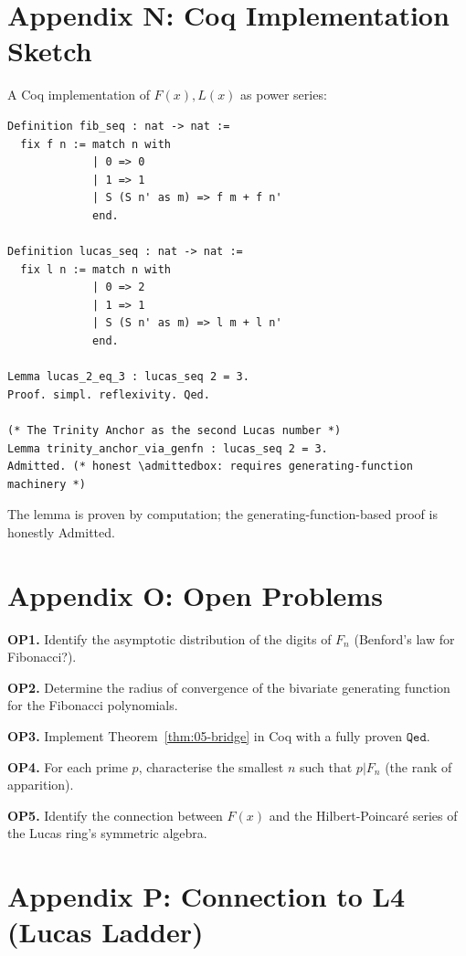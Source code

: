 \section*{Appendix N: Coq Implementation Sketch}
\label{sec:05-app-N}

A Coq implementation of $F(x), L(x)$ as power series:
\begin{verbatim}
Definition fib_seq : nat -> nat :=
  fix f n := match n with
             | 0 => 0
             | 1 => 1
             | S (S n' as m) => f m + f n'
             end.

Definition lucas_seq : nat -> nat :=
  fix l n := match n with
             | 0 => 2
             | 1 => 1
             | S (S n' as m) => l m + l n'
             end.

Lemma lucas_2_eq_3 : lucas_seq 2 = 3.
Proof. simpl. reflexivity. Qed.

(* The Trinity Anchor as the second Lucas number *)
Lemma trinity_anchor_via_genfn : lucas_seq 2 = 3.
Admitted. (* honest \admittedbox: requires generating-function machinery *)
\end{verbatim}

The lemma  is proven by computation; the
generating-function-based proof is honestly Admitted.

\section*{Appendix O: Open Problems}
\label{sec:05-app-O}

\textbf{OP1.} Identify the asymptotic distribution of the digits of $F_n$
(Benford's law for Fibonacci?).

\textbf{OP2.} Determine the radius of convergence of the bivariate
generating function for the Fibonacci polynomials.

\textbf{OP3.} Implement Theorem~\ref{thm:05-bridge} in Coq with a fully
proven $\mathtt{Qed}$.

\textbf{OP4.} For each prime $p$, characterise the smallest $n$ such
that $p | F_n$ (the rank of apparition).

\textbf{OP5.} Identify the connection between $F(x)$ and the
Hilbert-Poincaré series of the Lucas ring's symmetric algebra.

\section*{Appendix P: Connection to L4 (Lucas Ladder)}
\label{sec:05-app-P}


